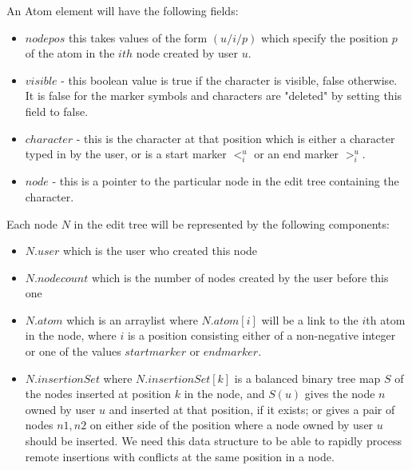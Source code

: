 \documentclass{amsart}
\begin{document}
An Atom element will have the following fields:
\begin{itemize}
\item $nodepos$ this takes values of the form $(u/i/p)$ which specify the position $p$ of the atom in the $ith$ node created by user $u$.
\item $visible$ - this boolean value is true if the character is visible, false otherwise. It is false for the marker symbols and characters are "deleted" by setting this field to false.
\item $character$ - this is the character at that position which is either a character typed in by the user, or is a start marker $<^u_i$ or an end marker $>^u_i$.
\item $node$ - this is a pointer to the particular node in the edit tree containing the character.
\end{itemize}

Each node $N$ in the edit tree will be represented by the following components:
\begin{itemize}
\item $N.user$ which is the user who created this node
\item $N.nodecount$ which is the number of nodes created by the user before this one
\item $N.atom$ which is an arraylist where $N.atom[i]$ will be a link to the $i$th atom in the node, where $i$ is a position consisting either of a non-negative integer or one of the values $startmarker$ or $endmarker$.
\item $N.insertionSet$ where $N.insertionSet[k]$ is a balanced binary tree map $S$ of the nodes inserted at position $k$ in the node, and $S(u)$ gives the node $n$ owned by user $u$ and inserted at that position, if it exists; or gives a pair of nodes $n1,n2$ on either side of the position where a node owned by user $u$ should be inserted. We need this data structure to be able to rapidly process remote insertions with conflicts at the same position in a node. 
\end{itemize}



%
\end{document}
